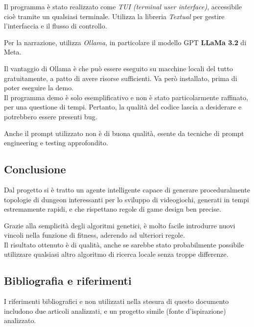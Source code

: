 \documentclass[12pt,titlepage]{article}
\begin{document}
\noindent Il programma è stato realizzato come \textit{TUI (terminal user interface)}, accessibile cioè tramite un qualsiasi terminale. Utilizza la libreria \textit{Textual} per gestire l'interfaccia e il flusso di controllo.

Per la narrazione, utilizza \textit{Ollama}, in particolare il modello GPT \textbf{LLaMa 3.2} di Meta.

Il vantaggio di Ollama è che può essere eseguito su macchine locali del tutto gratuitamente, a patto di avere risorse sufficienti. Va però installato, prima di poter eseguire la demo.\\

\noindent Il programma demo è solo esemplificativo e non è stato particolarmente raffinato, per una questione di tempi. Pertanto, la qualità del codice lascia a desiderare e potrebbero essere presenti bug.

Anche il prompt utilizzato non è di buona qualità, esente da tecniche di prompt engineering e testing approfondito.

\subsection {Conclusione}

Dal progetto si è tratto un agente intelligente capace di generare proceduralmente topologie di dungeon interessanti per lo sviluppo di videogiochi, generati in tempi estremamente rapidi, e che rispettano regole di game design ben precise.

Grazie alla semplicità degli algoritmi genetici, è molto facile introdurre nuovi vincoli nella funzione di fitness, aderendo ad ulteriori regole.\\

\noindent Il risultato ottenuto è di qualità, anche se sarebbe stato probabilmente possibile utilizzare qualsiasi altro algoritmo di ricerca locale senza troppe differenze.

\subsection {Bibliografia e riferimenti}

I riferimenti bibliografici e non utilizzati nella stesura di questo documento includono due articoli analizzati, e un progetto simile (fonte d'ispirazione) analizzato.

\printbibliography[heading=none]
\end{document}
